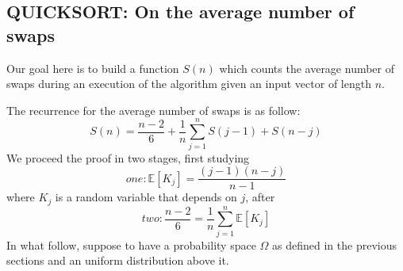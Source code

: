 \subsection{QUICKSORT: On the average number of swaps}
Our goal here is to build a function $S(n)$ which counts the average
number of swaps during an execution of the algorithm given an input
vector of length $n$.

The recurrence for the average number of swaps is as follow:
\begin{displaymath}
  S(n) =  \frac{n-2}{6} +  \frac{1}{n} \sum_{j=1}^{n}{S(j-1) + S(n-j)}
\end{displaymath}
We proceed the proof in two stages, first studying
\begin{displaymath}
  one: \mathbb{E} \left[K_j \right]  = \frac{(j-1)(n-j)}{n-1}
\end{displaymath}
where $K_j$ is a random variable that depends on $j$, after
\begin{displaymath}
  two: \frac{n-2}{6} = \frac{1}{n}\sum_{j=1}^{n}{
    \mathbb{E} \left[K_j \right] }
\end{displaymath}
In what follow, suppose to have a probability space $\Omega$ as
defined in the previous sections and an uniform distribution above it.
